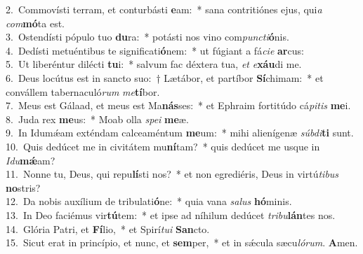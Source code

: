 {2.~}Commovísti terram, et conturbásti \textbf{e}am:~* sana contritiónes ejus, qui\textit{a} \textit{com}\textbf{mó}ta est.\\
{3.~}Ostendísti pópulo tuo \textbf{du}ra:~* potásti nos vino com\textit{pun}\textit{cti}\textbf{ó}nis.\\
{4.~}Dedísti metuéntibus te significati\textbf{ó}nem:~* ut fúgiant a fá\textit{ci}\textit{e} \textbf{ar}cus:\\
{5.~}Ut liberéntur dilécti \textbf{tu}i:~* salvum fac déxtera tua, \textit{et} \textit{e}\textbf{xáu}di me.\\
{6.~}Deus locútus est in sancto suo:~† Lætábor, et partíbor \textbf{Sí}chimam:~* et convállem tabernaculó\textit{rum} \textit{me}\textbf{tí}bor.\\
{7.~}Meus est Gálaad, et meus est Ma\textbf{nás}ses:~* et Ephraim fortitúdo cá\textit{pi}\textit{tis} \textbf{me}i.\\
{8.~}Juda rex \textbf{me}us:~* Moab olla \textit{spe}\textit{i} \textbf{me}æ.\\
{9.~}In Idumǽam exténdam calceaméntum \textbf{me}um:~* mihi alienígenæ \textit{súb}\textit{di}\textbf{ti} sunt.\\
{10.~}Quis dedúcet me in civitátem mu\textbf{ní}tam?~* quis dedúcet me usque in \textit{I}\textit{du}\textbf{mǽ}am?\\
{11.~}Nonne tu, Deus, qui repu\textbf{lí}sti nos?~* et non egrediéris, Deus in virtú\textit{ti}\textit{bus} \textbf{no}stris?\\
{12.~}Da nobis auxílium de tribulati\textbf{ó}ne:~* quia vana \textit{sa}\textit{lus} \textbf{hó}minis.\\
{13.~}In Deo faciémus vir\textbf{tú}tem:~* et ipse ad níhilum dedúcet \textit{tri}\textit{bu}\textbf{lán}tes nos.\\
{14.~}Glória Patri, et \textbf{Fí}lio,~* et Spirí\textit{tu}\textit{i} \textbf{San}cto.\\
{15.~}Sicut erat in princípio, et nunc, et \textbf{sem}per,~* et in sǽcula sæcu\textit{ló}\textit{rum}. \textbf{A}men.\\
